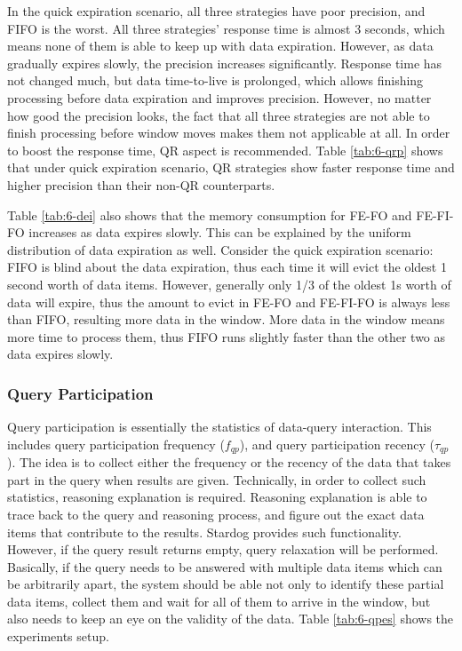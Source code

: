 In the quick expiration scenario, all three strategies have poor precision, and FIFO is the worst. 
All three strategies' response time is almost 3 seconds, which means none of them is able to keep up with data expiration. 
However, as data gradually expires slowly, the precision increases significantly.
Response time has not changed much, but data time-to-live is prolonged, which allows finishing processing before data expiration and improves precision. 
However, no matter how good the precision looks, the fact that all three strategies are not able to finish processing before window moves makes them not applicable at all. 
In order to boost the response time, QR aspect is recommended.
Table \ref{tab:6-qrp} shows that under quick expiration scenario, QR strategies show faster response time and higher precision than their non-QR counterparts. 

Table \ref{tab:6-dei} also shows that the memory consumption for FE-FO and FE-FI-FO increases as data expires slowly. 
This can be explained by the uniform distribution of data expiration as well. 
Consider the quick expiration scenario: 
FIFO is blind about the data expiration, thus each time it will evict the oldest 1 second worth of data items.
However, generally only 1/3 of the oldest 1s worth of data will expire, thus the amount to evict in FE-FO and FE-FI-FO is always less than FIFO, resulting more data in the window.
More data in the window means more time to process them, thus FIFO runs slightly faster than the other two as data expires slowly.
%
\subsubsection{Query Participation}
Query participation is essentially the statistics of data-query interaction.
This includes query participation frequency ($f_{qp}$), and query participation recency ($\tau_{qp}$).
The idea is to collect either the frequency or the recency of the data that takes part in the query when results are given.
Technically, in order to collect such statistics, reasoning explanation is required. 
Reasoning explanation is able to trace back to the query and reasoning process, and figure out the exact data items that contribute to the results.
Stardog provides such functionality. 
However, if the query result returns empty, query relaxation will be performed. 
Basically, if the query needs to be answered with multiple data items which can be arbitrarily apart, the system should be able not only to identify these partial data items, collect them and wait for all of them to arrive in the window, but also needs to keep an eye on the validity of the data. 
Table \ref{tab:6-qpes} shows the experiments setup. 

